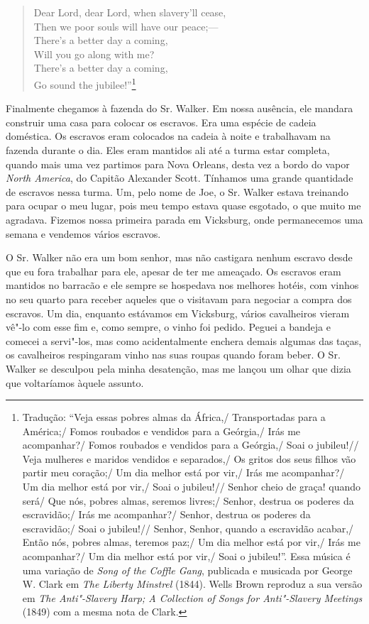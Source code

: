 \begin{verse}
Dear Lord, dear Lord, when slavery'll cease,\\
Then we poor souls will have our peace;---\\
There's a better day a coming,\\
Will you go along with me?\\
There's a better day a coming,\\
Go sound the jubilee!''\footnote{Tradução: ``Veja essas pobres almas da África,/ Transportadas para a América;/ Fomos roubados e vendidos para a Geórgia,/ Irás me acompanhar?/ Fomos roubados e vendidos para a Geórgia,/ Soai o jubileu!//
Veja mulheres e maridos vendidos e separados,/ Os gritos dos seus filhos vão partir meu coração;/
Um dia melhor está por vir,/ Irás me acompanhar?/ Um dia melhor está por vir,/ Soai o jubileu!//
Senhor cheio de graça! quando será/ Que nós, pobres almas, seremos livres;/ Senhor, destrua os poderes da escravidão;/ Irás me acompanhar?/ Senhor, destrua os poderes da escravidão;/ Soai o jubileu!// Senhor, Senhor, quando a escravidão acabar,/ Então nós, pobres almas, teremos paz;/ 
Um dia melhor está por vir,/ Irás me acompanhar?/ Um dia melhor está por vir,/ Soai o jubileu!''. Essa música é uma variação de \emph{Song of the Coffle Gang}, publicada e musicada por
  George W. Clark em \emph{The Liberty Minstrel} (1844). Wells Brown
  reproduz a sua versão em \emph{The Anti"-Slavery Harp; A Collection of
  Songs for Anti"-Slavery Meetings} (1849) com a mesma nota de Clark.}
\end{verse}

Finalmente chegamos à fazenda do Sr. Walker. Em nossa ausência, ele
mandara construir uma casa para colocar os escravos. Era uma espécie de
cadeia doméstica. Os escravos eram colocados na cadeia à noite e
trabalhavam na fazenda durante o dia. Eles eram mantidos ali até a turma
estar completa, quando mais uma vez partimos para Nova Orleans, desta
vez a bordo do vapor \emph{North America}, do Capitão Alexander Scott.
Tínhamos uma grande quantidade de escravos nessa turma. Um, pelo nome de
Joe, o Sr. Walker estava treinando para ocupar o meu lugar, pois meu
tempo estava quase esgotado, o que muito me agradava. Fizemos nossa
primeira parada em Vicksburg, onde permanecemos uma semana e vendemos
vários escravos.

O Sr. Walker não era um bom senhor, mas não castigara nenhum escravo
desde que eu fora trabalhar para ele, apesar de ter me ameaçado. Os
escravos eram mantidos no barracão e ele sempre se hospedava nos
melhores hotéis, com vinhos no seu quarto para receber aqueles que o
visitavam para negociar a compra dos escravos. Um dia, enquanto
estávamos em Vicksburg, vários cavalheiros vieram vê"-lo com esse fim e,
como sempre, o vinho foi pedido. Peguei a bandeja e comecei a servi"-los,
mas como acidentalmente enchera demais algumas das taças, os cavalheiros
respingaram vinho nas suas roupas quando foram beber. O Sr. Walker se
desculpou pela minha desatenção, mas me lançou um olhar que dizia que
voltaríamos àquele assunto.

